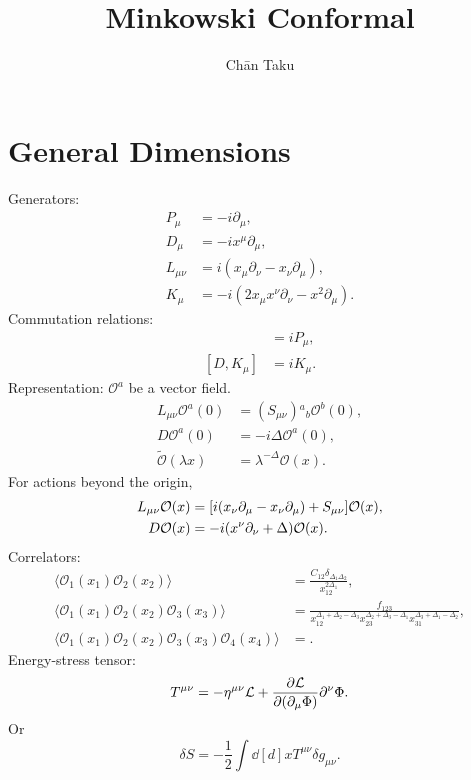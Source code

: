 \documentclass{article}
\title{Minkowski Conformal}
\author{Ch\=an Taku}
\begin{document}
\maketitle

\section{General Dimensions}

Generators:
\begin{align*}
    P_\mu &= -i\partial_\mu, \\
    D_\mu &= -i x^\mu \partial_\mu, \\
    L_{\mu\nu} &= i(x_\mu \partial_\nu - x_\nu \partial_\mu), \\
    K_\mu &= -i(2x_\mu x^\nu \partial_\nu - x^2 \partial_\mu).
\end{align*}
Commutation relations:
\begin{align*}
    [D,P_\mu] &= iP_\mu, \\
    [D,K_\mu] &= iK_\mu.
\end{align*}
Representation: $\mathcal{O}^a$ be a vector field.
\begin{align*}
    L_{\mu\nu} \mathcal{O}^a(0) &= (S_{\mu\nu}){^a}{_b} \mathcal{O}^b(0), \\
    D \mathcal{O}^a(0) &= -i \Delta \mathcal{O}^a(0), \\
    \tilde{\mathcal{O}}(\lambda x) &= \lambda^{-\Delta} \mathcal{O}(x).
\end{align*}
For actions beyond the origin,
\begin{align*}
    L_{\mu\nu} \mathcal{O}(x) &= \qty[i(x_\nu \partial_\mu - x_\nu \partial_\mu) + S_{\mu\nu}]\mathcal{O}(x), \\
    D \mathcal{O}(x) &= -i(x^\nu \partial_\nu + \Delta) \mathcal{O}(x).
\end{align*}
Correlators:
\begin{align*}
    \langle \mathcal{O}_1(x_1) \mathcal{O}_2(x_2) \rangle &= \frac{C_{12} \delta_{\Delta_1 \Delta_2}}{x^{2\Delta_1}_{12}}, \\
    \langle \mathcal{O}_1(x_1) \mathcal{O}_2(x_2) \mathcal{O}_3(x_3) \rangle &= \frac{f_{123}}{x^{\Delta_1+\Delta_2-\Delta_3}_{12} x^{\Delta_2+\Delta_3-\Delta_1}_{23} x^{\Delta_3+\Delta_1-\Delta_2}_{31}}, \\
    \langle \mathcal{O}_1(x_1) \mathcal{O}_2(x_2) \mathcal{O}_3(x_3) \mathcal{O}_4(x_4) \rangle &= .
\end{align*}
Energy-stress tensor:
\[ T^{\mu\nu} = -\eta^{\mu\nu} \mathcal{L} + \pdv{\mathcal{L}}{(\partial_\mu \Phi)} \partial^\nu \Phi. \]
Or
\[ \delta S = -\frac{1}{2} \int \dd[d]{x} T^{\mu\nu} \delta g_{\mu\nu}. \]
\end{document}
